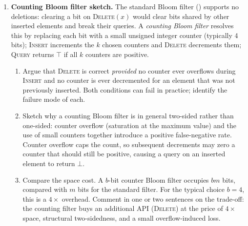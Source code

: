 \begin{enumerate}

\item \exstarstarstar
\label{ex:ch5-9}
\textbf{Counting Bloom filter sketch.}
The standard Bloom filter () supports no
deletions: clearing a bit on \textsc{Delete}$(x)$ would clear bits
shared by other inserted elements and break their queries. A
\emph{counting Bloom filter} resolves this by replacing each bit with
a small unsigned integer counter (typically 4 bits); \textsc{Insert}
increments the $k$ chosen counters and \textsc{Delete} decrements
them; \textsc{Query} returns $\top$ if all $k$ counters are positive.
\begin{enumerate}
  \item[(a)] Argue that \textsc{Delete} is correct \emph{provided}
    no counter ever overflows during \textsc{Insert} and no counter
    is ever decremented for an element that was not previously
    inserted. Both conditions can fail in practice; identify the
    failure mode of each.
  \item[(b)] Sketch why a counting Bloom filter is in general
    two-sided rather than one-sided: counter overflow (saturation
    at the maximum value) and the use of small counters together
    introduce a positive false-negative rate. Counter overflow caps
    the count, so subsequent decrements may zero a counter that
    should still be positive, causing a query on an inserted element
    to return $\bot$.
  \item[(c)] Compare the space cost. A $b$-bit counter Bloom filter
    occupies $bm$ bits, compared with $m$ bits for the standard
    filter. For the typical choice $b = 4$, this is a $4\times$
    overhead. Comment in one or two sentences on the trade-off: the
    counting filter buys an additional API (\textsc{Delete}) at the
    price of $4\times$ space, structural two-sidedness, and a small
    overflow-induced loss.
\end{enumerate}


\end{enumerate}
